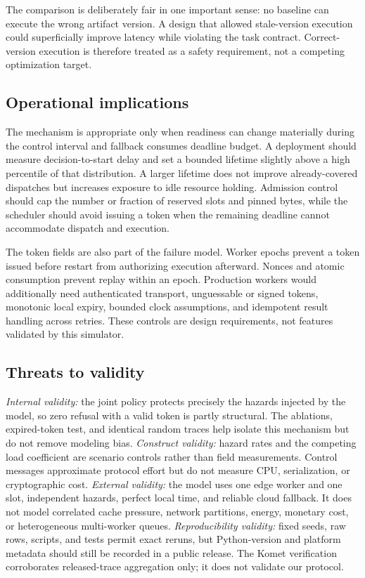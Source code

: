 \documentclass[conference]{IEEEtran}
\begin{document}
The comparison is deliberately fair in one important sense: no baseline can execute the wrong artifact version. A design that allowed stale-version execution could superficially improve latency while violating the task contract. Correct-version execution is therefore treated as a safety requirement, not a competing optimization target.

\subsection{Operational implications}

The mechanism is appropriate only when readiness can change materially during the
control interval and fallback consumes deadline budget. A deployment should measure
decision-to-start delay and set a bounded lifetime slightly above a high percentile
of that distribution. A larger lifetime does not improve already-covered dispatches
but increases exposure to idle resource holding. Admission control should cap the
number or fraction of reserved slots and pinned bytes, while the scheduler should
avoid issuing a token when the remaining deadline cannot accommodate dispatch and
execution.

The token fields are also part of the failure model. Worker epochs prevent a token
issued before restart from authorizing execution afterward. Nonces and atomic
consumption prevent replay within an epoch. Production workers would additionally
need authenticated transport, unguessable or signed tokens, monotonic local expiry,
bounded clock assumptions, and idempotent result handling across retries. These
controls are design requirements, not features validated by this simulator.

\subsection{Threats to validity}

\textit{Internal validity:} the joint policy protects precisely the hazards injected
by the model, so zero refusal with a valid token is partly structural. The ablations,
expired-token test, and identical random traces help isolate this mechanism but do
not remove modeling bias. \textit{Construct validity:} hazard rates and the competing
load coefficient are scenario controls rather than field measurements. Control
messages approximate protocol effort but do not measure CPU, serialization, or
cryptographic cost. \textit{External validity:} the model uses one edge worker and
one slot, independent hazards, perfect local time, and reliable cloud fallback. It
does not model correlated cache pressure, network partitions, energy, monetary cost,
or heterogeneous multi-worker queues. \textit{Reproducibility validity:} fixed seeds,
raw rows, scripts, and tests permit exact reruns, but Python-version and platform
metadata should still be recorded in a public release. The Komet verification
corroborates released-trace aggregation only; it does not validate our protocol.
\end{document}
